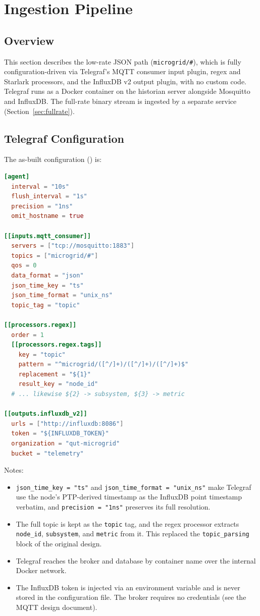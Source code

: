 \section{Ingestion Pipeline}
\label{sec:ingestion}

\subsection{Overview}
This section describes the low-rate JSON path (\texttt{microgrid/\#}), which is fully configuration-driven via Telegraf's MQTT consumer input plugin, regex and Starlark processors, and the InfluxDB v2 output plugin, with no custom code. Telegraf runs as a Docker container on the historian server alongside Mosquitto and InfluxDB. The full-rate binary stream is ingested by a separate service (Section~\ref{sec:fullrate}).

\subsection{Telegraf Configuration}
The as-built configuration () is:
\begin{lstlisting}[language=toml]
[agent]
  interval = "10s"
  flush_interval = "1s"
  precision = "1ns"
  omit_hostname = true

[[inputs.mqtt_consumer]]
  servers = ["tcp://mosquitto:1883"]
  topics = ["microgrid/#"]
  qos = 0
  data_format = "json"
  json_time_key = "ts"
  json_time_format = "unix_ns"
  topic_tag = "topic"

[[processors.regex]]
  order = 1
  [[processors.regex.tags]]
    key = "topic"
    pattern = "^microgrid/([^/]+)/([^/]+)/([^/]+)$"
    replacement = "${1}"
    result_key = "node_id"
  # ... likewise ${2} -> subsystem, ${3} -> metric

[[outputs.influxdb_v2]]
  urls = ["http://influxdb:8086"]
  token = "${INFLUXDB_TOKEN}"
  organization = "qut-microgrid"
  bucket = "telemetry"
\end{lstlisting}
Notes:
\begin{itemize}[noitemsep]
  \item \texttt{json\_time\_key = "ts"} and \texttt{json\_time\_format = "unix\_ns"} make Telegraf use the node's PTP-derived timestamp as the InfluxDB point timestamp verbatim, and \texttt{precision = "1ns"} preserves its full resolution.
  \item The full topic is kept as the \texttt{topic} tag, and the regex processor extracts \texttt{node\_id}, \texttt{subsystem}, and \texttt{metric} from it. This replaced the \texttt{topic\_parsing} block of the original design.
  \item Telegraf reaches the broker and database by container name over the internal Docker network.
  \item The InfluxDB token is injected via an environment variable and is never stored in the configuration file. The broker requires no credentials (see the MQTT design document).
\end{itemize}

